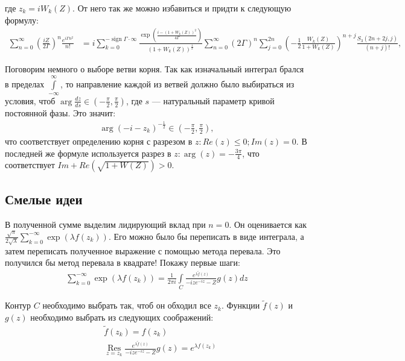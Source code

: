\documentclass[a4paper, 12pt]{article}
\DeclareMathOperator*{\Res}{Res}
\DeclareMathOperator*{\sign}{sign}
\begin{document}
где $z_k = i W_k(Z)$. От него так же можно избавиться и придти к следующую формулу:
\begin{equation}
\begin{aligned}
    \sum\limits_{n=0}^{\infty}\left(\frac{iZ}{2\Gamma}\right)^n  \frac{e^{i\Gamma n^2}}{n!} &= i
    \sum\limits_{k=0}^{-\sign\Gamma\cdot\infty} \frac{\exp\left(\frac{i-(1+W_k(Z))^2}{4\Gamma}\right)}{(1+W_k(Z))^{\frac{1}{2}}}
    \sum\limits_{n=0}^{\infty}\left(2\Gamma\right)^n
    \sum\limits_{j=0}^{2n}\left(-\frac{1}{2}\frac{W_k(Z)}{1+W_k(Z)}\right)^{n+j}\frac{S_3(2n+2j, j)}{(n+j)!},
\end{aligned}
\end{equation}

Поговорим немного о выборе ветви корня. Так как изначальный интеграл брался в пределах $\int\limits_{-\infty}^{\infty}$, то направление каждой из ветвей должно было выбираться из условия, чтоб $\arg\frac{dz}{ds}\in\left(-\frac{\pi}{2}, \frac{\pi}{2}\right)$, где $s$ --- натуральный параметр кривой постоянной фазы. Это значит:
\begin{equation}
\begin{aligned}
    \arg\left(-i-z_k\right)^{-\frac{1}{2}}\in\left(-\frac{\pi}{2}, \frac{\pi}{2}\right),
\end{aligned}
\end{equation}
что соответствует определению корня с разрезом в $z: Re(z)\leq 0; Im(z)=0$. В последней же формуле используется разрез в $z: \arg(z) = -\frac{3\pi}{4}$, что соответствует $Im+Re(\sqrt{1+W(Z)})>0$.
\subsection*{Смелые идеи}
В полученной сумме выделим лидирующий вклад при $n=0$. Он оценивается как $\frac{\sqrt{\pi}}{2\sqrt{\lambda}}\sum\limits_{k=0}^{-\infty}\exp\left(\lambda f(z_k)\right)$. Его можно было бы переписать в виде интеграла, а затем переписать полученное выражение с помощью метода перевала. Это получился бы метод перевала в квадрате! Покажу первые шаги:
\begin{equation}
\begin{aligned}
    \sum\limits_{k=0}^{-\infty}\exp\left(\lambda f(z_k)\right) = 
    \frac{1}{2\pi i}\int\limits_C \frac{e^{\lambda \tilde f(z)}}{-ize^{-iz}-Z} g(z)dz
\end{aligned}
\end{equation}

Контур $C$ необходимо выбрать так, чтоб он обходил все $z_k$. Функции $\tilde f(z)$ и $g(z)$ необходимо выбрать из следующих соображений:
\begin{equation}
\begin{aligned}
    &\tilde f (z_k) = f(z_k) \\
    &\Res\limits_{z=z_k} \frac{e^{\lambda \tilde f(z)}}{-ize^{-iz}-Z} g(z) = e^{\lambda f(z_k)}
\end{aligned}
\end{equation}
\end{document}
